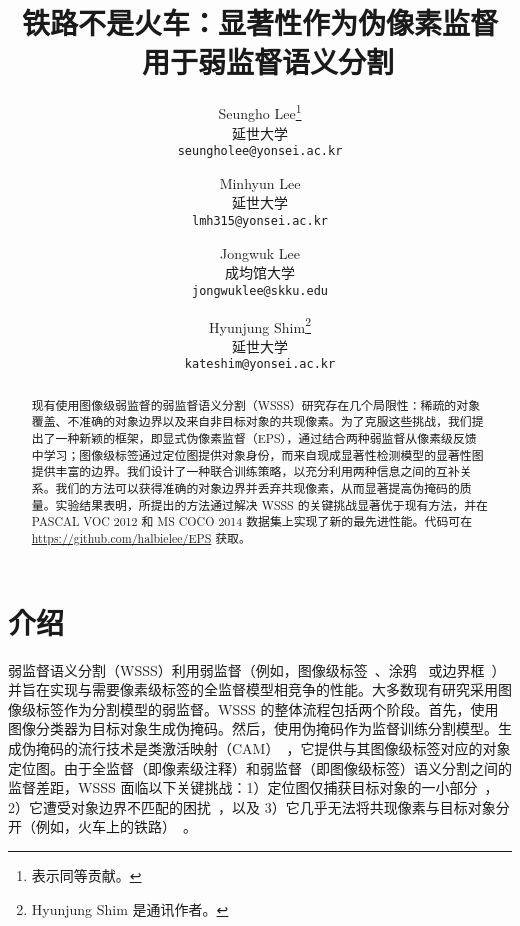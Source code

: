 \documentclass[final]{cvpr}
\begin{document}
\title{铁路不是火车：显著性作为伪像素监督 \ 用于弱监督语义分割}

\author{Seungho Lee\thanks{ 表示同等贡献。}\\
延世大学\\
{\tt\small seungholee@yonsei.ac.kr}
\and
Minhyun Lee\footnotemark[1]\\
延世大学\\
{\tt\small lmh315@yonsei.ac.kr}
\and 
Jongwuk Lee\\
成均馆大学\\
{\tt\small jongwuklee@skku.edu}
\and 
Hyunjung Shim\thanks{Hyunjung Shim 是通讯作者。}\\
延世大学\\
{\tt\small kateshim@yonsei.ac.kr}
}

\maketitle
\thispagestyle{empty}
\pagestyle{empty}


\begin{abstract}
现有使用图像级弱监督的弱监督语义分割（WSSS）研究存在几个局限性：稀疏的对象覆盖、不准确的对象边界以及来自非目标对象的共现像素。为了克服这些挑战，我们提出了一种新颖的框架，即显式伪像素监督（EPS），通过结合两种弱监督从像素级反馈中学习；图像级标签通过定位图提供对象身份，而来自现成显著性检测模型的显著性图提供丰富的边界。我们设计了一种联合训练策略，以充分利用两种信息之间的互补关系。我们的方法可以获得准确的对象边界并丢弃共现像素，从而显著提高伪掩码的质量。实验结果表明，所提出的方法通过解决 WSSS 的关键挑战显著优于现有方法，并在 PASCAL VOC 2012 和 MS COCO 2014 数据集上实现了新的最先进性能。代码可在 \href{https://github.com/halbielee/EPS}{https://github.com/halbielee/EPS} 获取。
\end{abstract}


\section{介绍}

弱监督语义分割（WSSS）利用弱监督（例如，图像级标签~\cite{pathak2015constrained, pinheiro2015image}、涂鸦~\cite{lin2016scribblesup} 或边界框~\cite{khoreva2017simple}）并旨在实现与需要像素级标签的全监督模型相竞争的性能。大多数现有研究采用图像级标签作为分割模型的弱监督。WSSS 的整体流程包括两个阶段。首先，使用图像分类器为目标对象生成伪掩码。然后，使用伪掩码作为监督训练分割模型。生成伪掩码的流行技术是类激活映射（CAM）~\cite{zhou2016learning}，它提供与其图像级标签对应的对象定位图。由于全监督（即像素级注释）和弱监督（即图像级标签）语义分割之间的监督差距，WSSS 面临以下关键挑战：1）定位图仅捕获目标对象的一小部分~\cite{zhou2016learning}，2）它遭受对象边界不匹配的困扰~\cite{kim2017two}，以及 3）它几乎无法将共现像素与目标对象分开（例如，火车上的铁路）~\cite{kolesnikov2016seed}。
\end{document}
